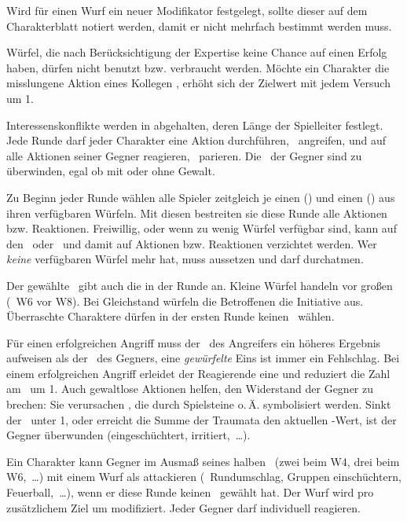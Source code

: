 {	Wird für einen Wurf ein neuer Modifikator festgelegt, sollte dieser auf dem Charakterblatt notiert werden, damit er nicht mehrfach bestimmt werden muss.

	Würfel, die nach Berücksichtigung der Expertise keine Chance auf einen Erfolg haben, dürfen nicht benutzt bzw. verbraucht werden. Möchte ein Charakter die misslungene Aktion eines Kollegen , erhöht sich der Zielwert mit jedem Versuch um 1.


	\noindent
	Interessenskonflikte werden in  abgehalten, deren Länge der Spielleiter festlegt. Jede Runde darf jeder Charakter eine Aktion durchführen, \zB\ angreifen, und auf alle Aktionen seiner Gegner reagieren, \zB\ parieren. Die \HD\ der Gegner sind zu überwinden, egal ob mit oder ohne Gewalt.

	Zu Beginn jeder Runde wählen alle Spieler zeitgleich je einen  (\AD) und einen  (\RD) aus ihren verfügbaren Würfeln. Mit diesen bestreiten sie diese Runde alle Aktionen bzw. Reaktionen. Freiwillig, oder wenn zu wenig Würfel verfügbar sind, kann auf den \AD\ oder \RD\ und damit auf Aktionen bzw. Reaktionen verzichtet werden. Wer \emph{keine} verfügbaren Würfel mehr hat, muss aussetzen und darf durchatmen.

	Der gewählte \AD\ gibt auch die  in der Runde an. Kleine Würfel handeln vor großen (\zB\ W6 vor W8). Bei Gleichstand würfeln die Betroffenen die Initiative aus. Überraschte Charaktere dürfen in der ersten Runde keinen \AD\ wählen.

	Für einen erfolgreichen Angriff muss der \AD\ des Angreifers ein höheres Ergebnis aufweisen als der \RD\ des Gegners, eine \emph{gewürfelte} Eins ist immer ein Fehlschlag. Bei einem erfolgreichen Angriff erleidet der Reagierende eine  und reduziert die Zahl am \HD\ um 1. Auch gewaltlose Aktionen helfen, den Widerstand der Gegner zu brechen: Sie verursachen , die durch Spielsteine o.\,Ä. symbolisiert werden. Sinkt der \HD\ unter 1, oder erreicht die Summe der Traumata den aktuellen \HD-Wert, ist der Gegner überwunden (eingeschüchtert, irritiert,~\ldots).

	Ein Charakter kann Gegner im Ausmaß seines halben \AD\ (zwei beim W4, drei beim W6,~\ldots) mit einem Wurf als  attackieren (\zB\ Rundumschlag, Gruppen einschüchtern, Feuerball,~\ldots), wenn er diese Runde keinen \RD\ gewählt hat. Der Wurf wird pro zusätzlichem Ziel um  modifiziert. Jeder Gegner darf individuell reagieren.

}
